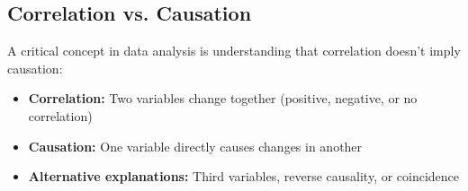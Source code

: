 
\subsection{Correlation vs. Causation}

A critical concept in data analysis is understanding that correlation doesn't imply causation:
\begin{itemize}
    \item \textbf{Correlation:} Two variables change together (positive, negative, or no correlation)
    \item \textbf{Causation:} One variable directly causes changes in another
    \item \textbf{Alternative explanations:} Third variables, reverse causality, or coincidence
\end{itemize}

